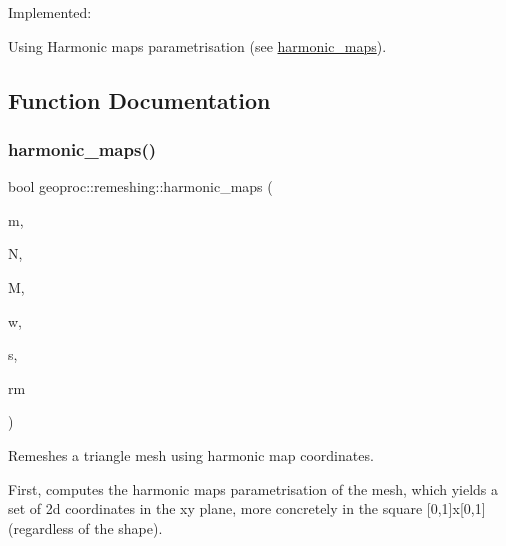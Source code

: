 Implemented\+:
\begin{DoxyItemize}
\item Using Harmonic maps\textquotesingle{} parametrisation (see \hyperlink{namespacegeoproc_1_1remeshing_a5ed68eab2cd304f825321c46cdcdc17e}{harmonic\+\_\+maps}). 
\end{DoxyItemize}

\subsection{Function Documentation}
\mbox{\label{namespacegeoproc_1_1remeshing_a5ed68eab2cd304f825321c46cdcdc17e}} 
\subsubsection{\texorpdfstring{harmonic\+\_\+maps()}{harmonic\_maps()}\hspace{0.1cm}{\footnotesize\ttfamily [1/2]}}
{\footnotesize\ttfamily bool geoproc\+::remeshing\+::harmonic\+\_\+maps (\begin{DoxyParamCaption}\item[{const \hyperlink{classgeoproc_1_1TriangleMesh}{Triangle\+Mesh} \&}]{m,  }\item[{size\+\_\+t}]{N,  }\item[{size\+\_\+t}]{M,  }\item[{const \hyperlink{namespacegeoproc_a12e5a10581b53b9dd9a509127527f843}{weight} \&}]{w,  }\item[{const \hyperlink{namespacegeoproc_a494da744a805b80f842402f0a806ccfc}{boundary\+\_\+shape} \&}]{s,  }\item[{\hyperlink{classgeoproc_1_1TriangleMesh}{Triangle\+Mesh} \&}]{rm }\end{DoxyParamCaption})}



Remeshes a triangle mesh using harmonic map coordinates. 

First, computes the harmonic maps parametrisation of the mesh, which yields a set of 2d coordinates in the xy plane, more concretely in the square \mbox{[}0,1\mbox{]}x\mbox{[}0,1\mbox{]} (regardless of the shape).

